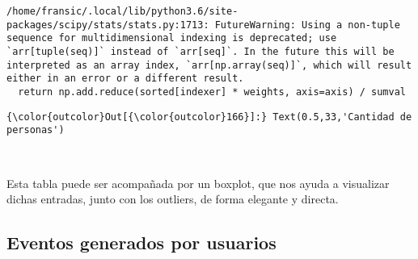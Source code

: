 \documentclass[11pt]{article}
\begin{document}
    \begin{Verbatim}[commandchars=\\\{\}]
/home/fransic/.local/lib/python3.6/site-packages/scipy/stats/stats.py:1713: FutureWarning: Using a non-tuple sequence for multidimensional indexing is deprecated; use `arr[tuple(seq)]` instead of `arr[seq]`. In the future this will be interpreted as an array index, `arr[np.array(seq)]`, which will result either in an error or a different result.
  return np.add.reduce(sorted[indexer] * weights, axis=axis) / sumval

    \end{Verbatim}

\begin{Verbatim}[commandchars=\\\{\}]
{\color{outcolor}Out[{\color{outcolor}166}]:} Text(0.5,33,'Cantidad de personas')
\end{Verbatim}
            
    \begin{center}
    \end{center}
    { \hspace*{\fill} \\}
    
    Esta tabla puede ser acompañada por un boxplot, que nos ayuda a
visualizar dichas entradas, junto con los outliers, de forma elegante y
directa.

    \subsection{Eventos generados por
usuarios}\label{eventos-generados-por-usuarios}
\end{document}
